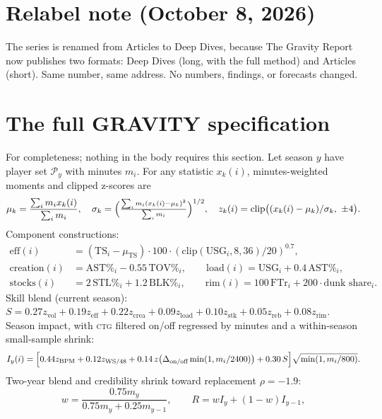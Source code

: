 \documentclass[11pt]{article}
\newcommand{\ctg}{\textsc{ctg}}
\begin{document}
\section*{Relabel note (October 8, 2026)}
The series is renamed from Articles to Deep Dives, because The Gravity Report now publishes two
formats: Deep Dives (long, with the full method) and Articles (short). Same number, same address.
No numbers, findings, or forecasts changed.

\appendix
\section{The full GRAVITY specification}
\label{app:spec}

For completeness; nothing in the body requires this section. Let season $y$ have player
set $\mathcal{P}_y$ with minutes $m_i$. For any statistic $x_k(i)$, minutes-weighted
moments and clipped z-scores are
\begin{equation}
\mu_k = \frac{\sum_i m_i x_k(i)}{\sum_i m_i}, \quad
\sigma_k = \Bigl(\tfrac{\sum_i m_i (x_k(i)-\mu_k)^2}{\sum_i m_i}\Bigr)^{1/2}, \quad
z_k(i) = \mathrm{clip}\bigl((x_k(i)-\mu_k)/\sigma_k,\ \pm 4\bigr).
\label{eq:moments}
\end{equation}
Component constructions:
\begin{align}
\text{eff}(i) &= (\mathrm{TS}_i - \mu_{\mathrm{TS}})\cdot 100 \cdot
(\mathrm{clip}(\mathrm{USG}_i, 8, 36)/20)^{0.7}, \\
\text{creation}(i) &= \mathrm{AST\%}_i - 0.55\,\mathrm{TOV\%}_i, \qquad
\text{load}(i) = \mathrm{USG}_i + 0.4\,\mathrm{AST\%}_i, \\
\text{stocks}(i) &= 2\,\mathrm{STL\%}_i + 1.2\,\mathrm{BLK\%}_i, \qquad
\text{rim}(i) = 100\,\mathrm{FTr}_i + 200\cdot\text{dunk share}_i.
\end{align}
Skill blend (current season): $S = 0.27 z_{\text{vol}} + 0.19 z_{\text{eff}} + 0.22
z_{\text{crea}} + 0.09 z_{\text{load}} + 0.10 z_{\text{stk}} + 0.05 z_{\text{reb}} +
0.08 z_{\text{rim}}$. Season impact, with \ctg{} filtered on/off regressed by minutes and
a within-season small-sample shrink:
\begin{equation}
I_y(i) = \Bigl[0.44 z_{\mathrm{BPM}} + 0.12 z_{\mathrm{WS/48}}
+ 0.14\, z\bigl(\Delta_{\text{on/off}} \min(1, m_i/2400)\bigr) + 0.30\, S\Bigr]
\sqrt{\min(1, m_i/800)}.
\label{eq:impact}
\end{equation}
Two-year blend and credibility shrink toward replacement $\rho = -1.9$:
\begin{equation}
w = \frac{0.75 m_y}{0.75 m_y + 0.25 m_{y-1}}, \qquad
R = w I_y + (1{-}w) I_{y-1},
\label{eq:blend}
\end{equation}
\end{document}

